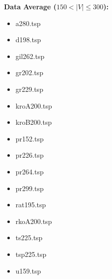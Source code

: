 \documentclass[11pt, english, openany]{report}
\begin{document}
\begin{appendices}
		
		\textbf{Data Average ($ 150 < |V| \le 300 $):}
		\begin{multicols}{4}
			\begin{itemize}
				\item a280.tsp
				\item d198.tsp
				\item gil262.tsp
				\item gr202.tsp
				\item gr229.tsp
				\item kroA200.tsp
				\item kroB200.tsp
				\item pr152.tsp
				\item pr226.tsp
				\item pr264.tsp
				\item pr299.tsp
				\item rat195.tsp
				\item rkoA200.tsp
				\item ts225.tsp
				\item tsp225.tsp
				\item u159.tsp
			\end{itemize}
		\end{multicols}
		

\end{appendices}
\end{document}
